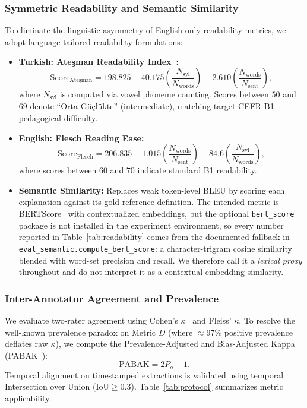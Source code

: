 \documentclass[conference]{IEEEtran}
\begin{document}
\subsubsection{Symmetric Readability and Semantic Similarity}
To eliminate the linguistic asymmetry of English-only readability metrics, we adopt language-tailored readability formulations:
\begin{itemize}
\item \textbf{Turkish: Ate\c{s}man Readability Index~\cite{atesman1997}:}
\begin{equation}
\mathrm{Score}_{\text{Ate\c{s}man}} = 198.825 - 40.175 \left(\frac{N_{\mathrm{syl}}}{N_{\mathrm{words}}}\right) - 2.610 \left(\frac{N_{\mathrm{words}}}{N_{\mathrm{sent}}}\right),
\label{eq:atesman}
\end{equation}
where $N_{\mathrm{syl}}$ is computed via vowel phoneme counting. Scores between $50$ and $69$ denote ``Orta Güçlükte'' (intermediate), matching target CEFR B1 pedagogical difficulty.
\item \textbf{English: Flesch Reading Ease:}
\begin{equation}
\mathrm{Score}_{\mathrm{Flesch}} = 206.835 - 1.015 \left(\frac{N_{\mathrm{words}}}{N_{\mathrm{sent}}}\right) - 84.6 \left(\frac{N_{\mathrm{syl}}}{N_{\mathrm{words}}}\right),
\label{eq:flesch}
\end{equation}
where scores between $60$ and $70$ indicate standard B1 readability.
\item \textbf{Semantic Similarity:} Replaces weak token-level BLEU by scoring each explanation against its gold reference definition. The intended metric is BERTScore~\cite{zhang2020bertscore} with contextualized embeddings, but the optional \texttt{bert\_score} package is not installed in the experiment environment, so every number reported in Table~\ref{tab:readability} comes from the documented fallback in \texttt{eval\_semantic.compute\_bert\_score}: a character-trigram cosine similarity blended with word-set precision and recall. We therefore call it a \emph{lexical proxy} throughout and do not interpret it as a contextual-embedding similarity.
\end{itemize}

\subsubsection{Inter-Annotator Agreement and Prevalence}
We evaluate two-rater agreement using Cohen's $\kappa$~\cite{cohen1960} and Fleiss' $\kappa$. To resolve the well-known prevalence paradox on Metric $D$ (where $\approx 97\%$ positive prevalence deflates raw $\kappa$), we compute the Prevalence-Adjusted and Bias-Adjusted Kappa (PABAK~\cite{byrt1993}):
\begin{equation}
\mathrm{PABAK} = 2 P_o - 1.
\label{eq:pabak}
\end{equation}
Temporal alignment on timestamped extractions is validated using temporal Intersection over Union ($\mathrm{IoU} \ge 0.3$). Table~\ref{tab:protocol} summarizes metric applicability.
\end{document}
